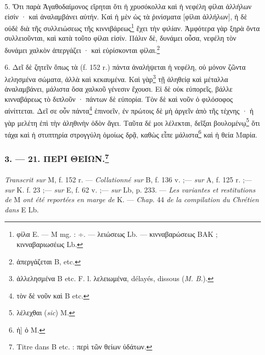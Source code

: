 \documentclass[a4paper, 11pt, oneside, polutonikogreek, french]{article}
\begin{document}
5. Ὅτι παρὰ Ἀγαθοδαίμονος εἴρηται ὅτι ἡ χρυσόκολλα καὶ ἡ νεφέλη φίλαι ἀλλήλων εἰσίν · καὶ ἀναλαμβάνει αὐτήν. Καὶ ἡ μὲν ὡς τὰ ῥινίσματα [φίλαι ἀλλήλων], ἡ δὲ οὐδὲ διὰ τῆς συλλειώσεως τῆς κιννιβάρεως\footnote{φίλα E. --- M mg. : ÷. --- λειώσεως Lb. --- κινναβαρώσεως BAK ; κινναβαριωσέως Lb.} ἔχει τὴν φιλίαν. Ἀμφότερα γὰρ ξηρὰ ὄντα συλλειοῦνται, καὶ κατὰ τοῦτο φίλαι εἰσίν. Πάλιν δὲ, δυνάμει οὖσα, νεφέλη τὸν δυνάμει χαλκὸν ἀπεργάζει · καὶ εὑρίσκονται φίλαι.\footnote{ἀπεργάζεται B, etc.}

6. Δεῖ δὲ ζητεῖν ὅπως τὰ (f. 152 r.) πάντα ἀναλήψεται ἡ νεφέλη, οὐ μόνον ζῶντα λελησμένα σώματα, ἀλλὰ καὶ κεκαυμένα. Καὶ γὰρ\footnote{ἀλλελησμένα B etc. F. l. λελειωμένα, délayés, dissous (\emph{M. B.}).} τῇ ἀληθείᾳ καὶ μέταλλα ἀναλαμβάνει, μάλιστα ὅσα χαλκοῦ γένεσιν ἔχουσι. Εἰ δὲ οὐκ εὐπορεῖς, βάλλε κινναβάρεως τὸ διπλοῦν · πάντων δὲ εὐπορία. Τὸν δὲ καὶ νοῦν ὁ φιλόσοφος αἰνίττεται. Δεῖ σε οὖν πάντα\footnote{τὸν δὲ νοῦν καὶ B etc.} ἐπινοεῖν, ἐν πρώτοις δὲ μὴ ἀργεῖν ἀπὸ τῆς τέχνης · ἡ γὰρ μελέτη ἐπὶ τὴν ἀληθινὴν ὁδὸν ἄγει. Ταῦτα δέ μοι λέλεκται, δεῖξαι βουλομένῳ\footnote{λέλεχθαι (\emph{sic}) M.} ὅτι τάχα καὶ ἡ στυπτηρία στρογγύλη ὁμοίως δρᾷ, καθὼς εἶπε μάλιστα\footnote{ἡ] ὁ M.} καὶ ἡ θεία Μαρία.

\bigskip
\centerline{\EightStarTaper}
\centerline{\EightStarTaper\EightStarTaper}
\bigskip

\subsubsection[3. --- 21. ΠΕΡΙ ΘΕΙΩΝ.]{3. --- 21. ΠΕΡΙ ΘΕΙΩΝ.\footnote{Titre dans B etc. : περὶ τῶν θείων ὑδάτων.}}
\paragraph{}
\emph{Transcrit sur} M, f. 152 r. --- \emph{Collationné sur} B, f. 136 v. ;--- \emph{sur} A, f. 125 r. ;--- \emph{sur} K. f. 23 ;--- \emph{sur} E, f. 62 v. ;--- \emph{sur} Lb, p. 233. --- \emph{Les variantes et restitutions de} M \emph{ont été reportées en marge de} K. --- \emph{Chap.} 44 \emph{de la compilation du Chrétien dans} E Lb.

\bigskip
\end{document}
